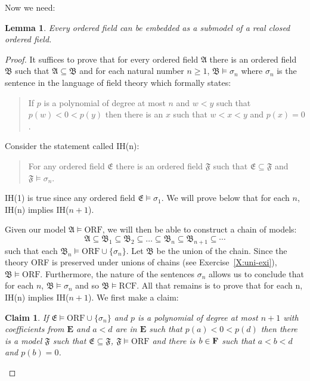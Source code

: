 \documentclass[titlepage, oneside]{amsbook}
\theoremstyle{plain}
\newtheorem{lemma}{Lemma}
\newtheorem*{claim}{Claim}
\theoremstyle{definition}
\theoremstyle{remark}
\newcommand{\seq}{\ensuremath{\subseteq}}
\newcommand{\ma}{\ensuremath{\mathfrak{A}}}
\newcommand{\mb}{\ensuremath{\mathfrak{B}}}
\newcommand{\me}{\ensuremath{\mathfrak{E}}}
\newcommand{\mf}{\ensuremath{\mathfrak{F}}}
\newcommand{\be}{\ensuremath{\mathbf{E}}}
\begin{document}
Now we need:

\begin{lemma}\label{L:ofrcf}
%
%
 Every ordered field can be embedded as a 
submodel of a real closed ordered field.
\end{lemma}


\begin{proof} It suffices to prove that for every ordered field $\ma$
there is an ordered field $\mb$ such that $\ma \seq \mb$ and for each
natural number $n \geq 1$, $\mb \models \sigma_n$ where $\sigma_n$ is
the sentence in the language of field theory which formally states: 
\begin{quotation} If $p$ is a polynomial of degree at most $n$ and $w <
y$ such that $p(w) < 0 < p(y)$ then there is an $x$ such that $w < x <
y$ and $p(x) =0$.
\end{quotation}

Consider the statement called IH(n):
\begin{quotation} For any ordered field $\me$ there is an ordered field
$\mf$ such that $\me \seq \mf$ and $\mf \models \sigma_n$.
\end{quotation}

IH(1) is true since any ordered field $\me \models \sigma_1$.  We will
prove below that for each $n$, IH(n) implies IH($n+1$).

 Given our model
$\ma \models \mbox{ORF}$, we will then be able to construct a chain of
models: 
\[ \ma \seq \mb_1 \seq \mb_2 \seq \dots \seq \mb_n \seq \mb_{n+1} \seq
\cdots \] such that each $\mb_n \models \mbox{ORF} \cup \{ \sigma_n
\}$.  Let $\mb$ be the union of the chain.  Since the theory ORF is
preserved under unions of chains (see Exercise~\ref{X:uni-exi}), $\mb
\models \mbox{ORF}$. Furthermore, the nature of the sentences
$\sigma_n$ allows us to conclude that for each $n$, $\mb \models
\sigma_n$ and so $\mb \models \mbox{RCF}$.  All that remains is to
prove that for each n, IH(n) implies IH($n+1$).  We first make a claim:

\begin{claim}  If $\me \models \mbox{ORF} \cup \{ \sigma_n \}$ and $p$
is a polynomial of degree at most $n+1$ with coefficients from $\be$
and $a < d$ are in $\be$ such that $p(a) < 0 < p (d)$ then there is a
model $\mf$ such that $\me \seq \mf$, $\mf \models \mbox{ORF}$ and
there is $b \in \bf{F}$ such that $a < b < d$ and $p(b) =0$.
\end{claim}


\end{proof}
\end{document}
